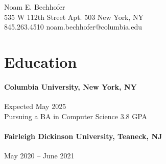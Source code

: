 \documentclass[10pt]{article}
\begin{document}
\pagestyle{fancy}
\fancyhf{} %
\renewcommand{\headrulewidth}{0pt} %


\begin{center}
    \begin{Large}
        Noam E. Bechhofer
        \\
        535 W 112th Street \quad Apt. 503 \quad New York, NY
        \\
        845.263.4510 \quad noam.bechhofer@columbia.edu
    \end{Large}
\end{center}


\vfill
\section*{Education}

\paragraph*{Columbia University, New York, NY} \hfill Expected May 2025
\\
Pursuing a BA in Computer Science \hfill 3.8 GPA

\paragraph*{Fairleigh Dickinson University, Teaneck, NJ} \hfill May 2020 – June 2021

\end{document}
